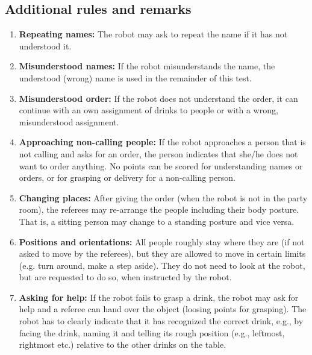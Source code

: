 \subsection{Additional rules and remarks}
\begin{enumerate}
	\item \textbf{Repeating names:} The robot may ask to repeat the name if it has not understood it.

	\item \textbf{Misunderstood names:} If the robot misunderstands the name, the understood (wrong) name is used in the remainder of this test.

	\item \textbf{Misunderstood order:} If the robot does not understand the order, it can continue with an own assignment of drinks to people or with a wrong, misunderstood assignment.

	\item \textbf{Approaching non-calling people:} If the robot approaches a person that is not calling and asks for an order, the person indicates that she/he does not want to order anything. No points can be scored for understanding names or orders, or for grasping or delivery for a non-calling person.

	\item \textbf{Changing places:} After giving the order (when the robot is not in the party room), the referees may re-arrange the people including their body posture. That is, a sitting person may change to a standing posture and vice versa.

	\item \textbf{Positions and orientations:} All people roughly stay where they are (if not asked to move by the referees), but they are allowed to move in certain limits (e.g. turn around, make a step aside). They do not need to look at the robot, but are requested to do so, when instructed by the robot.

	\item \textbf{Asking for help:} If the robot fails to grasp a drink, the robot may ask for help and a referee can hand over the object (loosing points for grasping). The robot has to clearly indicate that it has recognized the correct drink, e.g., by facing the drink, naming it and telling its rough position (e.g., leftmost, rightmost etc.) relative to the other drinks on the table.


\end{enumerate}
